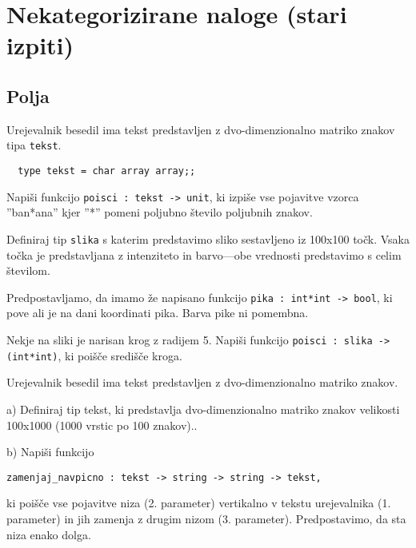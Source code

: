\chapter[Nekategorizirano]{Nekategorizirane naloge (stari  izpiti)}

\section{Polja}

\begin{ex}
  Urejevalnik besedil ima tekst predstavljen z dvo-dimenzionalno
  matriko znakov tipa \texttt{tekst}.

  \begin{verbatim}
  type tekst = char array array;;
  \end{verbatim}

  Napi\v si funkcijo \texttt{poisci : tekst -> unit}, ki izpi\v se vse
  pojavitve vzorca ''ban*ana'' kjer ''*'' pomeni poljubno \v stevilo
  poljubnih znakov.



\end{ex} 
\begin{ex}
  Definiraj tip \texttt{slika} s katerim predstavimo sliko sestavljeno
  iz 100x100 to\v ck. Vsaka to\v cka je predstavljana z intenziteto in
  barvo---obe vrednosti predstavimo s celim \v stevilom.

  Predpostavljamo, da imamo \v ze napisano funkcijo \texttt{pika :
    int*int -> bool}, ki pove ali je na dani koordinati pika. Barva
  pike ni pomembna.

  Nekje na sliki je narisan krog z radijem 5. Napi\v si funkcijo
  \texttt{poisci : slika -> (int*int)}, ki poi\v s\v ce sredi\v s\v ce
  kroga.


\end{ex} 
\begin{ex}
  Urejevalnik besedil ima tekst predstavljen z dvo-dimenzionalno
  matriko znakov.

  a) Definiraj tip tekst, ki predstavlja dvo-dimenzionalno matriko
  znakov velikosti 100x1000 (1000 vrstic po 100 znakov)..

  b) Napi\v si funkcijo

\begin{verbatim}
zamenjaj_navpicno : tekst -> string -> string -> tekst, 
\end{verbatim}

  ki poi\v s\v ce vse pojavitve niza (2. parameter) vertikalno v
  tekstu urejevalnika (1. parameter) in jih zamenja z drugim nizom
  (3. parameter). Predpostavimo, da sta niza enako dolga.


\end{ex} 


